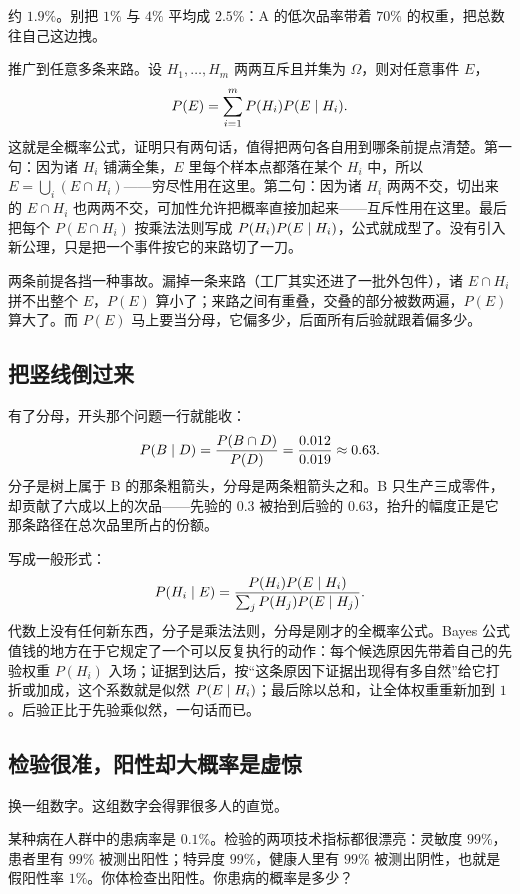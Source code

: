 约 \(1.9\%\)。别把 \(1\%\) 与 \(4\%\) 平均成 \(2.5\%\)：A 的低次品率带着 \(70\%\) 的权重，把总数往自己这边拽。

推广到任意多条来路。设 \(H_1,\ldots,H_m\) 两两互斥且并集为 \(\Omega\)，则对任意事件 \(E\)，
\[
P(E)=\sum_{i=1}^{m}P(H_i)P(E\mid H_i).
\]
这就是全概率公式，证明只有两句话，值得把两句各自用到哪条前提点清楚。第一句：因为诸 \(H_i\) 铺满全集，\(E\) 里每个样本点都落在某个 \(H_i\) 中，所以 \(E=\bigcup_i(E\cap H_i)\)——穷尽性用在这里。第二句：因为诸 \(H_i\) 两两不交，切出来的 \(E\cap H_i\) 也两两不交，可加性允许把概率直接加起来——互斥性用在这里。最后把每个 \(P(E\cap H_i)\) 按乘法法则写成 \(P(H_i)P(E\mid H_i)\)，公式就成型了。没有引入新公理，只是把一个事件按它的来路切了一刀。

两条前提各挡一种事故。漏掉一条来路（工厂其实还进了一批外包件），诸 \(E\cap H_i\) 拼不出整个 \(E\)，\(P(E)\) 算小了；来路之间有重叠，交叠的部分被数两遍，\(P(E)\) 算大了。而 \(P(E)\) 马上要当分母，它偏多少，后面所有后验就跟着偏多少。

\subsection{把竖线倒过来}

有了分母，开头那个问题一行就能收：
\[
P(B\mid D)=\frac{P(B\cap D)}{P(D)}=\frac{0.012}{0.019}\approx0.63.
\]
分子是树上属于 B 的那条粗箭头，分母是两条粗箭头之和。B 只生产三成零件，却贡献了六成以上的次品——先验的 \(0.3\) 被抬到后验的 \(0.63\)，抬升的幅度正是它那条路径在总次品里所占的份额。

写成一般形式：
\[
P(H_i\mid E)=\frac{P(H_i)P(E\mid H_i)}{\sum_j P(H_j)P(E\mid H_j)}.
\]
代数上没有任何新东西，分子是乘法法则，分母是刚才的全概率公式。Bayes 公式值钱的地方在于它规定了一个可以反复执行的动作：每个候选原因先带着自己的先验权重 \(P(H_i)\) 入场；证据到达后，按``这条原因下证据出现得有多自然''给它打折或加成，这个系数就是似然 \(P(E\mid H_i)\)；最后除以总和，让全体权重重新加到 \(1\)。后验正比于先验乘似然，一句话而已。

\subsection{检验很准，阳性却大概率是虚惊}

换一组数字。这组数字会得罪很多人的直觉。

某种病在人群中的患病率是 \(0.1\%\)。检验的两项技术指标都很漂亮：灵敏度 \(99\%\)，患者里有 \(99\%\) 被测出阳性；特异度 \(99\%\)，健康人里有 \(99\%\) 被测出阴性，也就是假阳性率 \(1\%\)。你体检查出阳性。你患病的概率是多少？

